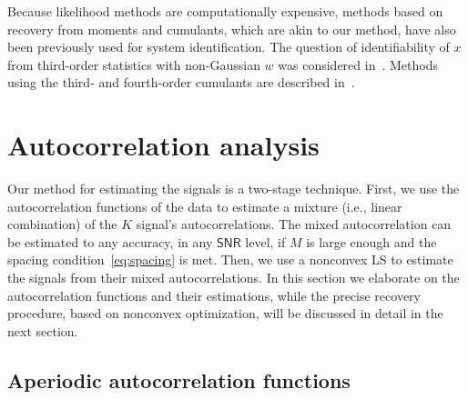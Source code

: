 \documentclass[english,11pt]{article}
\newcommand{\TODO}[1]{{\color{red}{[#1]}}}
\numberwithin{equation}{section}
\theoremstyle{plain}
\theoremstyle{definition}
\theoremstyle{remark}
\theoremstyle{plain}
\theoremstyle{remark}
\theoremstyle{plain}
\theoremstyle{plain}
\newcommand{\SNR}{{\textsf{SNR}}}
\begin{document}
Because likelihood methods are computationally expensive, methods based
on recovery from moments and cumulants, which are akin to our method, have
also been previously used for system identification. The question of identifiability
of $x$ from third-order statistics with non-Gaussian $w$ was considered in~\cite{lii1982deconvolution}. \TODO{how is it different from bispectrum inversion?}
Methods using the third- and fourth-order cumulants are described in~\cite{giannakis1989identification,tugnait1984identification}.


\section{Autocorrelation analysis}   \label{sec:autocorrelation}

Our method for estimating the signals is a two-stage technique. 
First, we use the autocorrelation functions of the data to estimate a mixture (i.e., linear combination) of the $K$ signal's autocorrelations. The mixed autocorrelation can be estimated to any accuracy, in any $\SNR$ level, if $M$ is large enough and the spacing condition~\eqref{eq:spacing} is met. Then, we  use a nonconvex LS  to estimate the signals from their mixed autocorrelations. 
In this section we elaborate on the autocorrelation functions and their estimations, while the precise recovery procedure, based on nonconvex optimization, will be discussed in detail in the next section.


\subsection{Aperiodic autocorrelation functions} \label{sec:aperiodic_ac}
\end{document}
